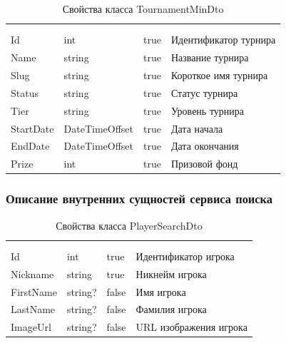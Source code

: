 \begin{xltabular}{\textwidth}{|X|X|X|X|}
	\caption{Свойства класса TournamentMinDto}\label{table:TournamentMinDto}\\ \hline
	 &  &  &  \\ \hline
	 &  &  &  \\ \hline
	\endfirsthead
	 \hline
	 &  &  &  \\ \hline
	\endhead
	Id & int & true & Идентификатор турнира \\ \hline
	Name & string & true & Название турнира \\ \hline
	Slug & string & true & Короткое имя турнира \\ \hline
	Status & string & true & Статус турнира \\ \hline
	Tier & string & true & Уровень турнира \\ \hline
	StartDate & DateTimeOffset & true & Дата начала \\ \hline
	EndDate & DateTimeOffset & true & Дата окончания \\ \hline
	Prize & int & true & Призовой фонд \\ \hline
\end{xltabular}


\subsubsection{Описание внутренних сущностей сервиса поиска}

\begin{xltabular}{\textwidth}{|X|X|X|X|}
	\caption{Свойства класса PlayerSearchDto}\label{table:PlayerSearchDto}\\ \hline
	 &  &  &  \\ \hline
	 &  &  &  \\ \hline
	\endfirsthead
	 \hline
	 &  &  &  \\ \hline
	\endhead
	Id & int & true & Идентификатор игрока \\ \hline
	Nickname & string & true & Никнейм игрока \\ \hline
	FirstName & string? & false & Имя игрока \\ \hline
	LastName & string? & false & Фамилия игрока \\ \hline
	ImageUrl & string? & false & URL изображения игрока \\ \hline
\end{xltabular}

